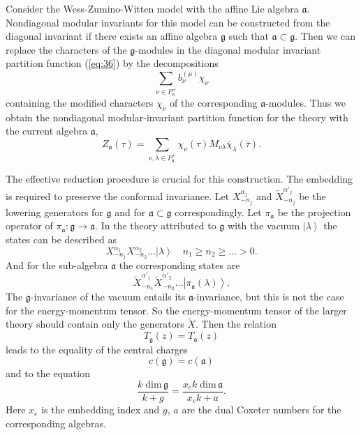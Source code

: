\documentclass[12pt]{iopart}
\theoremstyle{definition}
\begin{document}
Consider the Wess-Zumino-Witten model with the affine Lie algebra $\mathfrak{a}$.
Nondiagonal modular invariants for this model can be constructed from the diagonal
invariant if there exists an affine algebra $\mathfrak{g}$ such that $\mathfrak{a}\subset\mathfrak{g}$.
Then we can replace the characters of the $\mathfrak{g}$-modules in the diagonal
modular invariant partition function (\ref{eq:36})
by the decompositions
\begin{equation*}
  \label{eq:32}
\sum_{\nu \in P^{+}_{\mathfrak{a}}}b^{(\mu)}_{\nu} \chi_{\nu}
\end{equation*}
containing the modified characters $\chi_{\nu}$ of the corresponding $\mathfrak{a}$-modules.
Thus we obtain the nondiagonal modular-invariant  partition function for the theory with
the current algebra $\mathfrak{a}$,
\begin{equation}
  \label{eq:36}
   Z_{\mathfrak{a}}(\tau)=\sum_{ \nu,\lambda\in P^{+}_{\mathfrak{a}}} \chi_{\nu}(\tau)M_{\nu\lambda}\bar \chi_{\lambda}(\bar \tau).
\end{equation}

The effective reduction procedure is crucial for this construction.
The embedding is required to preserve the conformal invariance.
Let $X^{\alpha_j}_{-n_j}$ and $\tilde{X}^{\alpha'_j}_{-n_j}$ be the lowering generators for
$\mathfrak{g}$ and for $\mathfrak{a}\subset\mathfrak{g}$ correspondingly.
Let $\pi_{\mathfrak{a}}$ be the projection operator of
$\pi_{\mathfrak{a}}:\mathfrak{g}\longrightarrow \mathfrak{a}$.
In the theory attributed to $\mathfrak{g}$ with the vacuum $\left|\lambda\right>$
the states can be described as
\begin{equation*}
  \label{eq:109}
  X^{\alpha_1}_{-n_1}X^{\alpha_2}_{-n_2}\dots\left|\lambda\right>\quad n_1\geq n_2\geq \dots>0.
\end{equation*}
And for the sub-algebra $\mathfrak{a}$ the corresponding states are
\begin{equation*}
  \label{eq:110}
  \tilde{X}^{\alpha'_1}_{-n_1}\tilde{X}^{\alpha'_2}_{-n_2}\dots\left|\pi_{\mathfrak{a}}(\lambda)\right>.
\end{equation*}
The $\mathfrak{g}$-invariance of the vacuum entails its $\mathfrak{a}$-invariance,
but this is not the case for the energy-momentum tensor. So the energy-momentum tensor of the larger theory
should contain only the generators $\tilde{X}$. Then the relation
\begin{equation}
  \label{eq:2}
  T_{\mathfrak{g}}(z)=T_{\mathfrak{a}}(z)
\end{equation}
leads to the equality of the central charges
\begin{equation*}
  \label{eq:33}
  c(\mathfrak{g})=c(\mathfrak{a})
\end{equation*}
and to the equation
\begin{equation}
  \label{eq:111}
  \frac{k\;\mathrm{dim}\,\mathfrak{g}}{k+g}=\frac{x_e k\; \mathrm{dim}\,\mathfrak{a}}{x_ek+a}.
\end{equation}
Here $x_e$ is the embedding index and $g$, $a$ are the dual Coxeter numbers for the  corresponding algebras.
\end{document}
